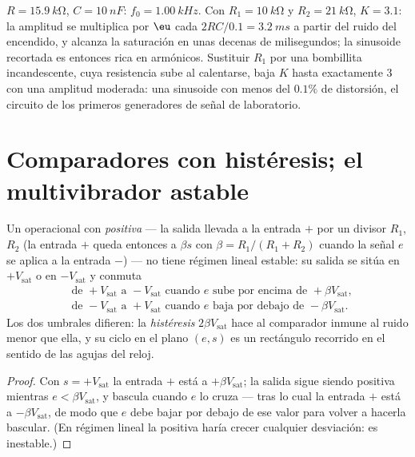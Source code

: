 \begin{example}\label{ex:b2:feedback-oscillators:wiennumbers}
$R = \qty{15.9}{k\ohm}$, $C = \qty{10}{nF}$: $f_0 = \qty{1.00}{kHz}$. Con $R_1 =
\qty{10}{k\ohm}$ y $R_2 = \qty{21}{k\ohm}$, $K = 3.1$: la amplitud se multiplica por
$\eu$ cada $2RC/0.1 = \qty{3.2}{ms}$ a partir del ruido del encendido, y
alcanza la saturación en unas decenas de milisegundos; la sinusoide
recortada es entonces rica en armónicos. Sustituir $R_1$ por una
bombillita incandescente, cuya resistencia sube al calentarse, baja $K$
hasta exactamente $3$ con una amplitud moderada: una sinusoide con menos
del $0.1\%$ de distorsión, el circuito de los primeros generadores de
señal de laboratorio.
\end{example}

\section{Comparadores con histéresis; el multivibrador astable}

\begin{proposition}\label{prop:b2:feedback-oscillators:schmitt}
Un operacional con  \emph{positiva} --- la salida llevada a la entrada $+$
por un divisor $R_1$, $R_2$ (la entrada $+$ queda entonces a $\beta s$ con
$\beta = R_1/(R_1 + R_2)$ cuando la señal $e$ se aplica a la entrada $-$)
--- no tiene régimen lineal estable: su salida se sitúa en $+V_{\text{sat}}$ o en
$-V_{\text{sat}}$ y conmuta
\begin{align*}
&\text{de } +V_{\text{sat}} \text{ a } -V_{\text{sat}} \text{ cuando } e \text{ sube por encima de } +\beta V_{\text{sat}} ,\\
&\text{de } -V_{\text{sat}} \text{ a } +V_{\text{sat}} \text{ cuando } e \text{ baja por debajo de } -\beta V_{\text{sat}} .
\end{align*}
Los dos umbrales difieren: la \emph{histéresis} $2\beta V_{\text{sat}}$ hace al
comparador inmune al ruido menor que ella, y su ciclo en el plano
$(e, s)$ es un rectángulo recorrido en el sentido de las agujas del reloj.
\end{proposition}

\begin{proof}
Con $s = +V_{\text{sat}}$ la entrada $+$ está a $+\beta V_{\text{sat}}$; la salida
sigue siendo positiva mientras $e < \beta V_{\text{sat}}$, y bascula cuando $e$ lo
cruza --- tras lo cual la entrada $+$ está a $-\beta V_{\text{sat}}$, de modo que $e$
debe bajar por debajo de ese valor para volver a hacerla bascular. (En
régimen lineal la  positiva haría crecer cualquier desviación: es inestable.)
\end{proof}

